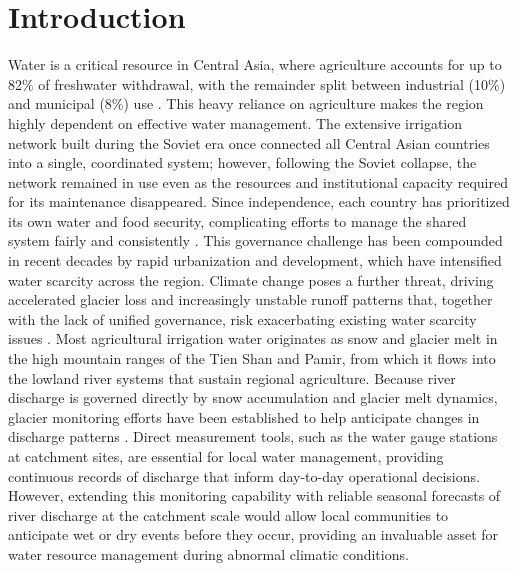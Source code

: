 \documentclass[review,12pt,authoryear]{elsarticle}
\begin{document}
\section{Introduction}
\label{sec:intro}

Water is a critical resource in Central Asia, where agriculture accounts for up to 82\% of freshwater withdrawal, with the remainder split between industrial (10\%) and municipal (8\%) use \citep{hernandez2025}. This heavy reliance on agriculture makes the region highly dependent on effective water management. The extensive irrigation network built during the Soviet era once connected all Central Asian countries into a single, coordinated system; however, following the Soviet collapse, the network remained in use even as the resources and institutional capacity required for its maintenance disappeared. Since independence, each country has prioritized its own water and food security, complicating efforts to manage the shared system fairly and consistently \citep{ohara2000, bamgboye2025}. This governance challenge has been compounded in recent decades by rapid urbanization and development, which have intensified water scarcity across the region. Climate change poses a further threat, driving accelerated glacier loss and increasingly unstable runoff patterns that, together with the lack of unified governance, risk exacerbating existing water scarcity issues \citep{guo2024, zhang2026}. Most agricultural irrigation water originates as snow and glacier melt in the high mountain ranges of the Tien Shan and Pamir, from which it flows into the lowland river systems that sustain regional agriculture. Because river discharge is governed directly by snow accumulation and glacier melt dynamics, glacier monitoring efforts have been established to help anticipate changes in discharge patterns \citep{zhang2026, barandun2021}. Direct measurement tools, such as the water gauge stations at catchment sites, are essential for local water management, providing continuous records of discharge that inform day-to-day operational decisions. However, extending this monitoring capability with reliable seasonal forecasts of river discharge at the catchment scale would allow local communities to anticipate wet or dry events before they occur, providing an invaluable asset for water resource management during abnormal climatic conditions.
\end{document}
